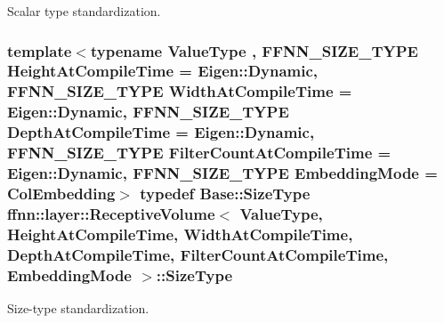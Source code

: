 Scalar type standardization. 

\hypertarget{classffnn_1_1layer_1_1_receptive_volume_a3e9853931ec53fae609bb3fef11fa325}{
\subsubsection[{Size\-Type}]{\setlength{\rightskip}{0pt plus 5cm}template$<$typename Value\-Type , F\-F\-N\-N\-\_\-\-S\-I\-Z\-E\-\_\-\-T\-Y\-P\-E Height\-At\-Compile\-Time = Eigen\-::\-Dynamic, F\-F\-N\-N\-\_\-\-S\-I\-Z\-E\-\_\-\-T\-Y\-P\-E Width\-At\-Compile\-Time = Eigen\-::\-Dynamic, F\-F\-N\-N\-\_\-\-S\-I\-Z\-E\-\_\-\-T\-Y\-P\-E Depth\-At\-Compile\-Time = Eigen\-::\-Dynamic, F\-F\-N\-N\-\_\-\-S\-I\-Z\-E\-\_\-\-T\-Y\-P\-E Filter\-Count\-At\-Compile\-Time = Eigen\-::\-Dynamic, F\-F\-N\-N\-\_\-\-S\-I\-Z\-E\-\_\-\-T\-Y\-P\-E Embedding\-Mode = Col\-Embedding$>$ typedef {\bf Base\-::\-Size\-Type} {\bf ffnn\-::layer\-::\-Receptive\-Volume}$<$ Value\-Type, Height\-At\-Compile\-Time, Width\-At\-Compile\-Time, Depth\-At\-Compile\-Time, Filter\-Count\-At\-Compile\-Time, {\bf Embedding\-Mode} $>$\-::{\bf Size\-Type}}}\label{classffnn_1_1layer_1_1_receptive_volume_a3e9853931ec53fae609bb3fef11fa325}


Size-\/type standardization. 



